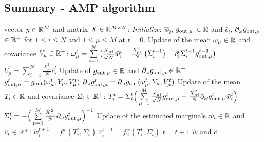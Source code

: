 \documentclass[aip,jmp,amsmath,amssymb,reprint]{revtex4}
\begin{document}
\subsection*{Summary - AMP algorithm}

\begin{algorithm} 
\begin{algorithmic}
     vector $y \in \mathbb{R}^M$ and matrix $X\in \mathbb{R}^{M \times N}$:
    \STATE \emph{Initialize}: $\hat{w}_i$, $g_{\rm out,\mu}$ $\in \mathbb{R}$ and $\hat{c}_i$, $\partial_{\omega} g_{\rm out , \mu}$ $\in \mathbb{R}^+$ for $ 1 \leq i \leq N $ and $ 1 \leq \mu \leq M $ at $t=0$.
    \REPEAT   
    \STATE Update of the mean $\omega_{\mu} \in \mathbb{R}$ and covariance $V_{\mu}\in \mathbb{R}^+$: \spacecase
    \hspace{0.5cm} $\omega_{\mu}^t = \sum\limits_{i = 1}^N \big(\frac{X_{\mu
      i}}{\sqrt{N}}\hat{w}_{i}^t -    \frac{X_{\mu
      i}^2}{N}
    \left(\Sigma_{i}^{t-1}\right)^{-1}\hat{c}_{i}^t \Sigma_{i
    }^{t-1}g_{\rm out,\mu}^{t-1} \big)  $  \spacecase
    \hspace{0.5cm} $V_{\mu}^t = \sum\limits_{i=1}^N\frac{X_{\mu
      i}^2}{N} \hat{c}_{i}^t $\spacecase
    \STATE Update of $g_{\rm out, \mu} \in \mathbb{R}$ and $\partial_{\omega} g_{\rm out , \mu} \in \mathbb{R}^+$: \spacecase
    \hspace{0.5cm}$g_{\rm out, \mu}^t = g_{\rm out} (\omega_{\mu}^t , Y_{\mu}, V_{\mu}^t) $ \spacecase
     \hspace{0.5cm} $ \partial_{\omega} g_{\rm out, \mu}^t = \partial_{\omega}  g_{\rm out} (\omega_{\mu}^t , Y_{\mu}, V_{\mu}^t)  $ \spacecase
    \STATE Update of the mean $T_i \in \mathbb{R}$ and covariance $\Sigma_i \in \mathbb{R}^+$:\spacecase
    \hspace{0.5cm}$T_i^t = \Sigma_{i}^t \Big(  \sum\limits_{\mu =1}^M
      \frac{X_{\mu
      i}}{\sqrt{N}}g_{\rm out,\mu}^t  -\frac{X_{\mu
      i}^2}{N}  \partial_{\omega} g_{\rm out , \mu}^t \hat{w}_{i}^t \Big) $ \spacecase 
      \hspace{0.5cm} $  \Sigma_{i}^t = -\Big(\sum\limits_{\mu =1}^M \frac{X_{\mu
      i}^2}{N}  \partial_\omega g_{\rm out,\mu}^t \Big)^{-1} $\spacecase
    \STATE Update of the estimated marginals $\hat{w}_i \in \mathbb{R}$ and $\hat{c}_i \in \mathbb{R}^+$: \spacecase
   \hspace{0.5cm}$\hat{w}_i^{t+1} = f_1^w( T_i^t,  \Sigma_i^t  ) $\spacecase
   \hspace{0.5cm}$   \hat{c}_i^{t+1} = f_2^w(T_i^t,  \Sigma_i^t  )$\spacecase
    \STATE ${t} = {t} + 1$ 
    $\hat{w}$ and $\hat{c}$.
\end{algorithmic}
\end{algorithm}
\end{document}
